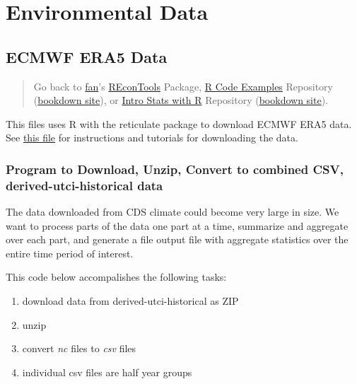 \documentclass[
]{book}
\providecommand{\tightlist}{%
  \setlength{\itemsep}{0pt}\setlength{\parskip}{0pt}}
\begin{document}
\hypertarget{environmental-data}{%
\section{Environmental Data}\label{environmental-data}}

\hypertarget{ecmwf-era5-data}{%
\subsection{ECMWF ERA5 Data}\label{ecmwf-era5-data}}

\begin{quote}
Go back to \href{http://fanwangecon.github.io/}{fan}'s \href{https://fanwangecon.github.io/REconTools/}{REconTools} Package, \href{https://fanwangecon.github.io/R4Econ/}{R Code Examples} Repository (\href{https://fanwangecon.github.io/R4Econ/bookdown}{bookdown site}), or \href{https://fanwangecon.github.io/Stat4Econ/}{Intro Stats with R} Repository (\href{https://fanwangecon.github.io/Stat4Econ/bookdown}{bookdown site}).
\end{quote}

This files uses R with the reticulate package to download ECMWF ERA5 data. See \href{https://fanwangecon.github.io/pyfan/vig/getdata/envir/htmlpdfr/fs_ecmwf.html}{this file} for instructions and tutorials for downloading the data.

\hypertarget{program-to-download-unzip-convert-to-combined-csv-derived-utci-historical-data}{%
\subsubsection{Program to Download, Unzip, Convert to combined CSV, derived-utci-historical data}\label{program-to-download-unzip-convert-to-combined-csv-derived-utci-historical-data}}

The data downloaded from CDS climate could become very large in size. We want to process parts of the data one part at a time, summarize and aggregate over each part, and generate a file output file with aggregate statistics over the entire time period of interest.

This code below accompalishes the following tasks:

\begin{enumerate}
\def\labelenumi{\arabic{enumi}.}
\tightlist
\item
  download data from derived-utci-historical as ZIP
\item
  unzip
\item
  convert \emph{nc} files to \emph{csv} files
\item
  individual csv files are half year groups
\end{enumerate}
\end{document}
